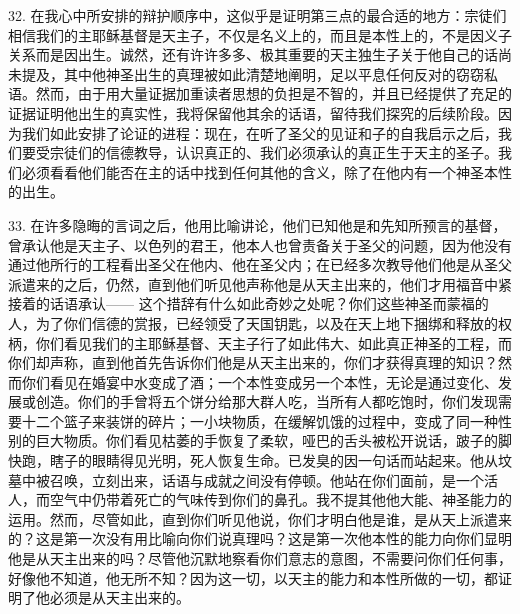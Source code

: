32. 在我心中所安排的辩护顺序中，这似乎是证明第三点的最合适的地方：宗徒们相信我们的主耶稣基督是天主子，不仅是名义上的，而且是本性上的，不是因义子关系而是因出生。诚然，还有许许多多、极其重要的天主独生子关于他自己的话尚未提及，其中他神圣出生的真理被如此清楚地阐明，足以平息任何反对的窃窃私语。然而，由于用大量证据加重读者思想的负担是不智的，并且已经提供了充足的证据证明他出生的真实性，我将保留他其余的话语，留待我们探究的后续阶段。因为我们如此安排了论证的进程：现在，在听了圣父的见证和子的自我启示之后，我们要受宗徒们的信德教导，认识真正的、我们必须承认的真正生于天主的圣子。我们必须看看他们能否在主的话中找到任何其他的含义，除了在他内有一个神圣本性的出生。\par

33. 在许多隐晦的言词之后，他用比喻讲论，他们已知他是和先知所预言的基督，曾承认他是天主子、以色列的君王，他本人也曾责备关于圣父的问题，因为他没有通过他所行的工程看出圣父在他内、他在圣父内；在已经多次教导他们他是从圣父派遣来的之后，仍然，直到他们听见他声称他是从天主出来的，他们才用福音中紧接着的话语承认——  这个措辞有什么如此奇妙之处呢？你们这些神圣而蒙福的人，为了你们信德的赏报，已经领受了天国钥匙，以及在天上地下捆绑和释放的权柄，你们看见我们的主耶稣基督、天主子行了如此伟大、如此真正神圣的工程，而你们却声称，直到他首先告诉你们他是从天主出来的，你们才获得真理的知识？然而你们看见在婚宴中水变成了酒；一个本性变成另一个本性，无论是通过变化、发展或创造。你们的手曾将五个饼分给那大群人吃，当所有人都吃饱时，你们发现需要十二个篮子来装饼的碎片；一小块物质，在缓解饥饿的过程中，变成了同一种性别的巨大物质。你们看见枯萎的手恢复了柔软，哑巴的舌头被松开说话，跛子的脚快跑，瞎子的眼睛得见光明，死人恢复生命。已发臭的因一句话而站起来。他从坟墓中被召唤，立刻出来，话语与成就之间没有停顿。他站在你们面前，是一个活人，而空气中仍带着死亡的气味传到你们的鼻孔。我不提其他他大能、神圣能力的运用。然而，尽管如此，直到你们听见他说，你们才明白他是谁，是从天上派遣来的？这是第一次没有用比喻向你们说真理吗？这是第一次他本性的能力向你们显明他是从天主出来的吗？尽管他沉默地察看你们意志的意图，不需要问你们任何事，好像他不知道，他无所不知？因为这一切，以天主的能力和本性所做的一切，都证明了他必须是从天主出来的。\par

